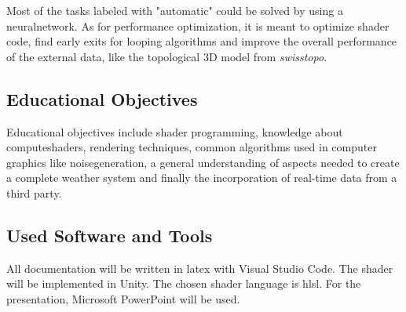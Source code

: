 \noindent
Most of the tasks labeled with "automatic" could be solved by using a \gls{neuralnetwork}.
As for performance optimization, it is meant to optimize shader code, find early exits for looping algorithms and improve the overall performance of the external data, like the topological 3D model from \emph{swisstopo}.

\subsection{Educational Objectives}
Educational objectives include \gls{shader} programming, knowledge about \gls{computeshader}s, rendering techniques, common algorithms used in computer graphics like \gls{noisegeneration}, a general understanding of aspects needed to create a complete weather system and finally the incorporation of real-time data from a third party.

\subsection{Used Software and Tools}
All documentation will be written in \gls{latex} with Visual Studio Code.
The \gls{shader} will be implemented in Unity. The chosen \gls{shader} language is \gls{hlsl}.
For the presentation, Microsoft PowerPoint will be used.